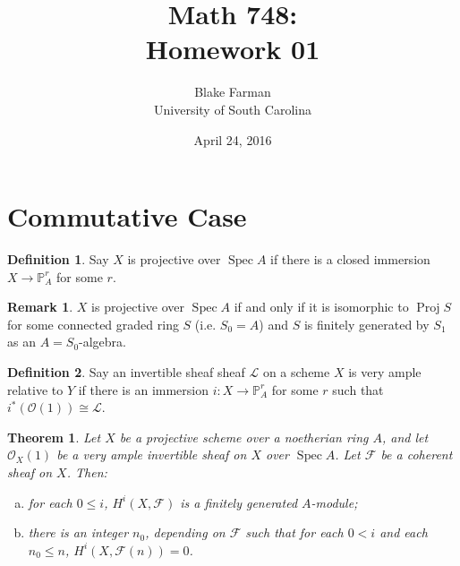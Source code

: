 \documentclass[10pt]{amsart}
\author{Blake Farman\\University of South Carolina}
\title{Math 748:\\Homework 01}
\date{April 24, 2016}
\begin{document}

\providecommand{\p}{\mathfrak{p}}
\providecommand{\m}{\mathfrak{m}}
\providecommand{\Deck}[1]{\operatorname{Deck}\left(#1\right)}
\newtheorem{thm}{Theorem}
\newtheorem{ex}{}
\newtheorem{lem}{Lemma}
\newtheorem{cor}{Corollary}
\newtheorem{prop}{Proposition}
\theoremstyle{definition}
\newtheorem{defn}{Definition}
\newtheorem{rmk}{Remark}

\newcommand{\A}{\mathscr{A}}
\renewcommand{\C}{\mathscr{C}}

\section{Commutative Case}
\begin{defn}
  Say $X$ is projective over $\operatorname{Spec} A$ if there is a closed immersion $X \rightarrow \mathbb{P}^r_A$ for some $r$.
\end{defn}

\begin{rmk}
  $X$ is projective over $\operatorname{Spec} A$ if and only if it is isomorphic to $\operatorname{Proj} S$ for some connected graded ring $S$ (i.e. $S_0 = A$) and $S$ is finitely generated by $S_1$ as an $A = S_0$-algebra.
\end{rmk}

\begin{defn}
  Say an invertible sheaf sheaf $\mathscr{L}$ on a scheme $X$ is very ample relative to $Y$ if there is an immersion $i : X \rightarrow \mathbb{P}^r_A$ for some $r$ such that $i^*(\mathcal{O}(1)) \cong \mathscr{L}$.
\end{defn}
\begin{thm}
  Let $X$ be a projective scheme over a noetherian ring $A$, and let $\mathcal{O}_X(1)$ be a very ample invertible sheaf on $X$ over $\operatorname{Spec} A$.
  Let $\mathscr{F}$ be a coherent sheaf on $X$. Then:
  \begin{enumerate}[(a)]
  \item
    for each $0 \leq i$, $H^i(X,\mathscr{F})$ is a finitely generated $A$-module;
  \item
    there is an integer $n_0$, depending on $\mathscr{F}$ such that for each $0 < i$ and each $n_0 \leq n$, $H^i(X, \mathscr{F}(n)) = 0$.
  \end{enumerate}
\end{thm}
\end{document}
